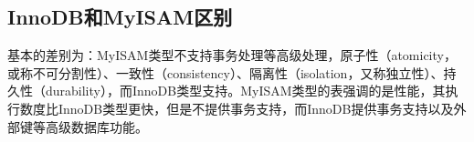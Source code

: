 \documentclass[../../../interview-questions.tex]{subfiles}
\begin{document}
\subsection{InnoDB和MyISAM区别}

基本的差别为：MyISAM类型不支持事务处理等高级处理，原子性（atomicity，或称不可分割性）、一致性（consistency）、隔离性（isolation，又称独立性）、持久性（durability），而InnoDB类型支持。MyISAM类型的表强调的是性能，其执行数度比InnoDB类型更快，但是不提供事务支持，而InnoDB提供事务支持以及外部键等高级数据库功能。
\end{document}
